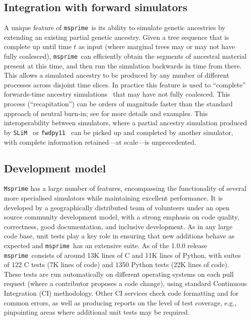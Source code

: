 \documentclass{article}
\newcommand{\msprime}[0]{\texttt{msprime}}
\newcommand{\SLiM}[0]{\texttt{SLiM}}
\newcommand{\fwdpy}[0]{\texttt{fwdpy11}}
\begin{document}
\subsection*{Integration with forward simulators}
A unique feature of \msprime\ is its ability to simulate
genetic ancestries by extending an existing partial
genetic ancestry. Given a tree sequence that
is complete up until time $t$ as input
(where marginal trees may or may not have fully coalesced),
\msprime\ can efficiently obtain the segments of ancestral material
present at this time, and then run the simulation backwards in time from there.
This allows a simulated ancestry to be produced by any
number of different processes across disjoint time slices.
In practice this feature is used to ``complete''
forwards-time ancestry simulations~\citep{kelleher2018efficient}
that may have not fully coalesced. This process
(``recapitation'') can be orders of magnitude faster than
the standard approach of neutral burn-in; see
\cite{haller2018tree} for more details and examples.
This interoperability between simulators, where a partial ancestry
simulation produced by \SLiM~\citep{haller2019slim}
or \fwdpy~\citep{thornton2014cpp} can be picked up and completed
by another simulator, with complete information
retained---at scale---is unprecedented.

\subsection*{Development model}
\texttt{Msprime} has a large number of features, encompassing
the functionality of several more specialised simulators
while maintaining excellent performance.
It is developed by a geographically distributed team of volunteers under an
open source community development model, with a strong emphasis
on code quality, correctness, good documentation, and inclusive development.
As in any large code base,
unit tests play a key role in ensuring that new additions behave
as expected and \msprime\ has an extensive suite.
As of the 1.0.0 release \msprime\ consists of around 13K lines of C and 11K
lines of Python, with suites of 122 C tests (7K lines of code) and
1350 Python tests (22K lines of code). These tests are run
automatically on different operating systems on each pull request
(where a contributor proposes a code change), using standard Continuous
Integration (CI) methodology. Other CI services check code formatting
and for common errors, as well as producing reports on the level of
test coverage, e.g., pinpointing areas where additional unit tests may
be required.
\end{document}

